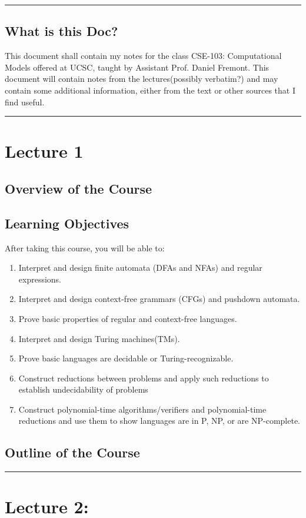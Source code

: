 \documentclass{article}
\begin{document}
\begin{center}
	\rule{450pt}{1pt} 
\end{center}

\subsection*{What is this Doc?}
This document shall contain my notes for the class CSE-103: Computational Models offered at UCSC, taught by Assistant Prof. Daniel Fremont. This document will contain notes from the lectures(possibly verbatim?) and may contain some additional information, either from the text or other sources that I find useful.


\begin{center}
	\rule{450pt}{3pt} 
\end{center}
\newpage



\section*{Lecture 1}

\subsection*{Overview of the Course}




\subsection*{Learning Objectives}
After taking this course, you will be able to:
\begin{enumerate}
    \item Interpret and design finite automata (DFAs and NFAs) and regular expressions.
    \item Interpret and design context-free grammars (CFGs) and pushdown automata.
    \item Prove basic properties of regular and context-free languages.
    \item Interpret and design Turing machines(TMs).
    \item Prove basic languages are decidable or Turing-recognizable.
    \item Construct reductions between problems and apply such reductions to establish undecidability of problems
    \item Construct polynomial-time algorithms/verifiers and polynomial-time reductions and use them to show languages are in P, NP, or are NP-complete.
\end{enumerate}


\subsection*{Outline of the Course}

\begin{center}
	\rule{450pt}{1pt} 
\end{center}
\newpage

\section*{Lecture 2:}
\end{document}
